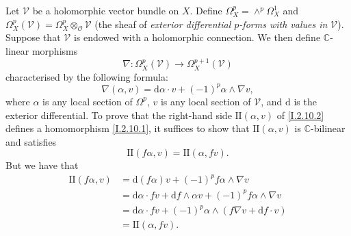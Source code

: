 \documentclass{report}
\theoremstyle{plain}
\theoremstyle{definition}
\newenvironment{env}[1]
    {\renewcommand\theinnercustomenv{#1}\innercustomenv}
    {\endinnercustomenv}
\newcommand{\sh}{\mathscr}
\newcommand{\CC}{\mathbb{C}}
\newcommand{\dd}{\mathrm{d}}
\begin{document}
\begin{env}{2.10}
\label{I.2.10}
  Let $\sh{V}$ be a holomorphic vector bundle on $X$.
  Define $\Omega_X^p=\wedge^p\Omega_X^1$ and $\Omega_X^p(\sh{V})=\Omega_X^p\otimes_\sh{O}\sh{V}$ (the sheaf of \emph{exterior differential $p$-forms with values in $\sh{V}$}).
  Suppose that $\sh{V}$ is endowed with a holomorphic connection.
  We then define $\CC$-linear morphisms
  \[
  \label{I.2.10.1}
    \nabla\colon \Omega_X^p(\sh{V}) \to \Omega_X^{p+1}(\sh{V})
  \tag{2.10.1}
  \]
  characterised by the following formula:
  \[
  \label{I.2.10.2}
    \nabla(\alpha,v) = \dd\alpha\cdot v + (-1)^p\alpha\wedge\nabla v,
  \tag{2.10.2}
  \]
  where $\alpha$ is any local section of $\Omega^p$, $v$ is any local section of $\sh{V}$, and $\dd$ is the exterior differential.
  To prove that the right-hand side $\mathrm{II}(\alpha,v)$ of \cref{I.2.10.2} defines a homomorphism \cref{I.2.10.1}, it suffices to show that $\mathrm{II}(\alpha,v)$ is $\CC$-bilinear and satisfies
  \[
    \mathrm{II}(f\alpha,v) = \mathrm{II}(\alpha,fv).
  \]
  But we have that
  \[
    \begin{aligned}
      \mathrm{II}(f\alpha,v)
      &= \dd(f\alpha)v + (-1)^pf\alpha\wedge\nabla v
    \\&= \dd\alpha\cdot fv + \dd f\wedge\alpha v + (-1)^pf\alpha\wedge\nabla v
    \\&= \dd\alpha\cdot fv + (-1)^p\alpha\wedge(f\nabla v+\dd f\cdot v)
    \\&= \mathrm{II}(\alpha,fv).
    \end{aligned}
  \]


\end{env}
\end{document}
